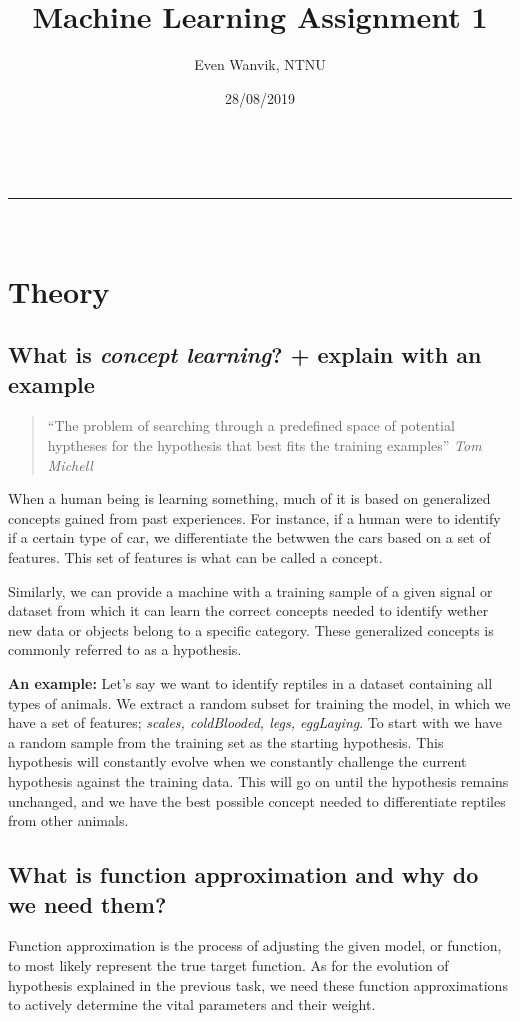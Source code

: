 \documentclass[a4paper,11pt]{article}
\makeatletter
\newcommand{\linia}{\rule{\linewidth}{0.5pt}}
\theoremstyle{mytheor}
\renewcommand{\maketitle}{
\begin{center}
\vspace{2ex}
{\huge \textsc{\@title}}
\vspace{1ex}
\\
\linia\\
\@author \hfill \@date
\vspace{4ex}
\end{center}
}
\makeatother
\begin{document}
\title{Machine Learning Assignment 1}

\author{Even Wanvik, NTNU}

\date{28/08/2019}

\maketitle

\section{Theory}

\subsection{What is \textit{concept learning}? + explain with an example}
\begin{quotation}
  ``The problem of searching through a predefined space of potential hyptheses for the hypothesis that best fits the training examples''
  \em Tom Michell
\end{quotation}
When a human being is learning something, much of it is based on generalized concepts gained from past experiences. For instance, if a human were to identify if a certain type of car, we differentiate the betwwen the cars based on a set of features. This set of features is what can be called a concept. 

Similarly, we can provide a machine with a training sample of a given signal or dataset from which it can learn the correct concepts needed to identify wether new data or objects belong to a specific category. These generalized concepts is commonly referred to as a hypothesis. 

\textbf{An example:} Let's say we want to identify reptiles in a dataset containing all types of animals. We extract a random subset for training the model, in which we have a set of features; \textit{scales, coldBlooded, legs, eggLaying}. To start with we have a random sample from the training set as the starting hypothesis. This hypothesis will constantly evolve when we constantly challenge the current hypothesis against the training data. This will go on until the hypothesis remains unchanged, and we have the best possible concept needed to differentiate reptiles from other animals.


\subsection{What is function approximation and why do we need them?}
Function approximation is the process of adjusting the given model, or function, to most likely represent the true target function. As for the evolution of hypothesis explained in the previous task, we need these function approximations to actively determine the vital parameters and their weight.
\end{document}
